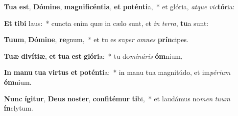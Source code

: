 \item \textbf{Tu}\textbf{a} \textbf{est}, \textbf{Dó}\textbf{mi}\textbf{ne}, \textbf{ma}\textbf{gni}\textbf{fi}\textbf{cén}\textbf{ti}\textbf{a}, \textbf{et} \textbf{pot}\textbf{én}\textbf{ti}a,~* et glória, \textit{at}\textit{que} \textit{vic}\textbf{tó}ria:
\item \textbf{Et} \textbf{ti}\textbf{bi} laus:~* cuncta enim quæ in cælo sunt, et \textit{in} \textit{ter}\textit{ra}, \textbf{tu}a sunt:
\item \textbf{Tu}\textbf{um}, \textbf{Dó}\textbf{mi}\textbf{ne}, \textbf{re}gnum,~* et tu es su\textit{per} \textit{om}\textit{nes} \textbf{prín}cipes.
\item \textbf{Tu}\textbf{æ} \textbf{di}\textbf{ví}\textbf{ti}\textbf{æ}, \textbf{et} \textbf{tu}\textbf{a} \textbf{est} \textbf{gló}\textbf{ri}a:~* tu do\textit{mi}\textit{ná}\textit{ris} \textbf{óm}nium,
\item \textbf{In} \textbf{ma}\textbf{nu} \textbf{tu}\textbf{a} \textbf{vir}\textbf{tus} \textbf{et} \textbf{pot}\textbf{én}\textbf{ti}a:~* in manu tua magnitúdo, et im\textit{pé}\textit{ri}\textit{um} \textbf{óm}nium.
\item \textbf{Nunc} \textbf{í}\textbf{gi}\textbf{tur}, \textbf{De}\textbf{us} \textbf{nos}\textbf{ter}, \textbf{con}\textbf{fi}\textbf{té}\textbf{mur} \textbf{ti}bi,~* et laudámus no\textit{men} \textit{tu}\textit{um} \textbf{ín}clytum.
